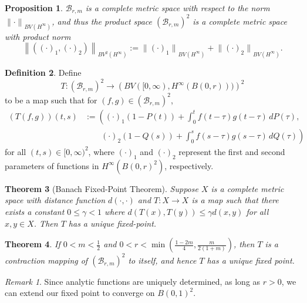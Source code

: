 \documentclass[12pt]{amsart}
\theoremstyle{plain}
\newtheorem{thm}{Theorem}[section]
\newtheorem{prop}[thm]{Proposition}
\theoremstyle{definition}
\newtheorem{defn}[thm]{Definition}
\theoremstyle{remark}
\newtheorem*{rem}{Remark}
\theoremstyle{definition}
\begin{document}
\begin{prop}
$\mathcal{B}_{r,m}$ is a complete metric space with respect to the norm ${\| \cdot \|}_{BV(H^\infty)}$, and thus the product space $\left( \mathcal{B}_{r,m} \right)^2$ is a complete metric space with product norm 
\begin{equation}
{\left\| \left( (\cdot)_1, (\cdot)_2 \right) \right\|}_{{BV}^2(H^\infty)} := {\|(\cdot)_1\|}_{BV(H^\infty)} + {\|(\cdot)_2\|}_{BV(H^\infty)}.
\end{equation}
\end{prop}

\begin{defn}
Define
\begin{equation}
T:\left( \mathcal{B}_{r,m} \right)^2 \to \left( BV([0,\infty),H^\infty(B(0,r))) \right)^2
\end{equation}
to be a map such that for $(f,g) \in \left( \mathcal{B}_{r,m} \right)^2$,
\begin{align}
(T(f,g))(t,s) & := \left( (\cdot)_1 (1-P(t)) + \int_0^t f(t-\tau)g(t-\tau) \, dP(\tau), \right. \nonumber \\
& \quad \quad \left. (\cdot)_2 (1-Q(s)) + \int_0^s f(s-\tau)g(s-\tau) \, dQ(\tau) \right)
\end{align}
for all $(t,s) \in [0,\infty)^2$, where $(\cdot)_1$ and $(\cdot)_2$ represent the first and second parameters of functions in $H^\infty(B(0,r)^2)$, respectively.
\end{defn}

\begin{thm}[Banach Fixed-Point Theorem] \label{bfpt}
Suppose $X$ is a complete metric space with distance function $d(\cdot,\cdot)$ and $T:X \to X$ is a map such that there exists a constant $0 \leq \gamma<1$ where $d(T(x),T(y)) \leq \gamma d(x,y)$ for all $x,y \in X$. Then $T$ has a unique fixed-point.
\end{thm}

\begin{thm}
\label{fixed point}
If $\displaystyle 0 < m < \frac{1}{2}$ and $\displaystyle 0 < r < \min \left( \frac{1-2m}{4}, \frac{m}{2(1+m)} \right)$, then $T$ is a contraction mapping of $\left( \mathcal{B}_{r,m} \right)^2$ to itself, and hence $T$ has a unique fixed point.
\end{thm}

\begin{rem}
Since analytic functions are uniquely determined, as long as $r > 0$, we can extend our fixed point to converge on $B(0,1)^2$.
\end{rem}
\end{document}
